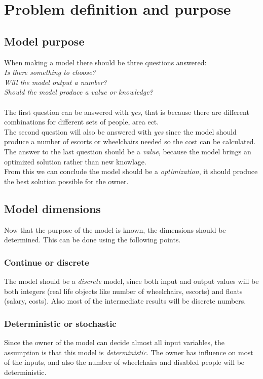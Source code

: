 \documentclass[a4paper, 12pt, notitlepage]{report}
\begin{document}
\section{Problem definition and purpose}
\subsection{Model purpose}
When making a model there should be three questions answered:\\
\emph{Is there something to choose?\\
Will the model output a number?\\
Should the model produce a value or knowledge?}\\\\
The first question can be answered with \emph{yes}, that is because there are different combinations for different sets of people, area ect.\\
The second question will also be answered with \emph{yes} since the model should produce a number of escorts or wheelchairs needed so the cost can be calculated.\\
The answer to the last question should be a \emph{value}, because the model brings an optimized solution rather than new knowlage.\\ From this we can conclude the model should be a \emph{optimization}, it should produce the best solution possible for the owner.
\subsection{Model dimensions}
Now that the purpose of the model is known, the dimensions should be determined. This can be done using the following points.
\subsubsection{Continue or discrete}
The model should be a \emph{discrete} model, since both input and output values will be both integers (real life objects like number of wheelchairs, escorts) and floats (salary, costs). Also most of the intermediate results will be discrete numbers.
\subsubsection{Deterministic or stochastic}
Since the owner of the model can decide almost all input variables, the assumption is that this model is \emph{deterministic}. The owner has influence on most of the inputs, and also the number of wheelchairs and disabled people will be deterministic.
\end{document}
